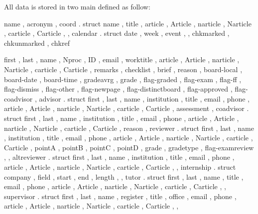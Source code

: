 \documentclass[article,nofontwarning,nogeometry,english,tocdepth=3,secdepth=3]{ufrgscca} %
\begin{document}
All data is stored in two main  defined as follow:

\begin{codestore}[st=activitydef]
  {
    name , acronym ,
    coord . struct 
      {
        name , title ,
        article , Article , narticle , Narticle , carticle , Carticle ,
      } ,
    calendar . struct
      {
        date ,  week , event ,
      } ,
      chkmarked , chkunmarked , chkref
  }
\end{codestore}

\label{activity-def}


\begin{codestore}[st=studentdef]
 {
  first , last , name , Nproc , ID , email , worktitle ,
        article , Article , narticle , Narticle , carticle , Carticle ,
  remarks , checklist , brief , reason , 
  board-local , board-date , board-time , gradeavrg , grade ,
  flag-graded , %
  flag-exam ,
  flag-ff ,
  flag-dismiss , %
  flag-other   , %
  flag-newpage , %
  flag-distinctboard , %
  flag-approved ,
  flag-coadvisor ,
  advisor . struct {
    first , last , name , institution , title , email , phone ,    
        article , Article , narticle , Narticle , carticle , Carticle ,
    assessment 
  } ,
  coadvisor . struct {
    first , last , name , institution , title , email , phone ,    
        article , Article , narticle , Narticle , carticle , Carticle ,
    reason 
  } ,
  reviewer . struct {
    first , last , name , institution , title , email , phone ,    
        article , Article , narticle , Narticle , carticle , Carticle ,
    pointA , pointB , pointC , pointD , grade , gradetype ,  flag-examreview ,  
  } ,
  altreviewer . struct {
    first , last , name , institution , title , email , phone ,    
        article , Article , narticle , Narticle , carticle , Carticle ,
  } ,
  internship . struct {
    company , field , start , end , length , 
  } ,
  tutor . struct {
    first , last , name , title , email , phone ,    
        article , Article , narticle , Narticle , carticle , Carticle ,
  } ,
  supervisor . struct {
    first , last , name , register , title , office , email , phone ,    
        article , Article , narticle , Narticle , carticle , Carticle ,
  } ,
 }
\end{codestore}
\end{document}
